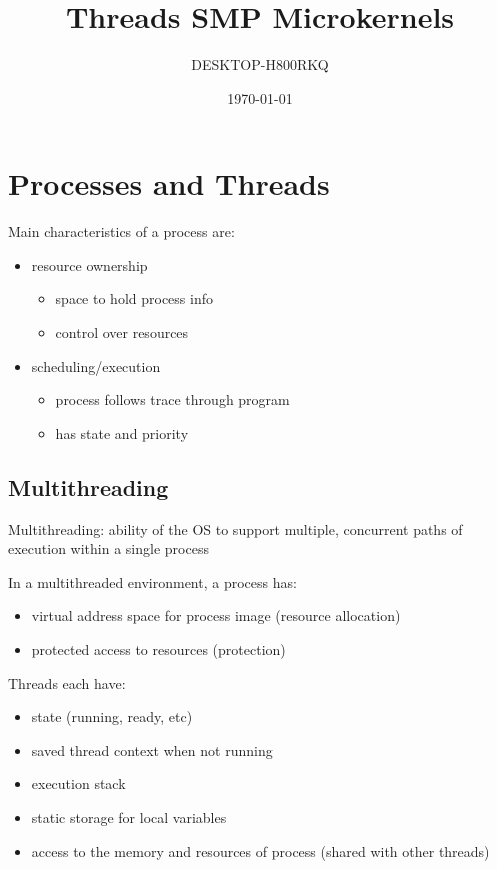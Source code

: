 \documentclass[11pt]{article}
\author{DESKTOP-H800RKQ}
\date{\today}
\title{Threads SMP Microkernels}
\begin{document}
\maketitle
\tableofcontents

\setlength\parindent{0pt}
\section{Processes and Threads}
\label{sec:org8b6a5e0}
Main characteristics of a process are:
\begin{itemize}
\item resource ownership
\begin{itemize}
\item space to hold process info
\item control over resources
\end{itemize}
\item scheduling/execution
\begin{itemize}
\item process follows trace through program
\item has state and priority
\end{itemize}
\end{itemize}
\subsection{Multithreading}
\label{sec:org333c881}

Multithreading: ability of the OS to support multiple,
concurrent paths of execution within a single process

In a multithreaded environment, a process has:
\begin{itemize}
\item virtual address space for process image (resource allocation)
\item protected access to resources (protection)
\end{itemize}

Threads each have:
\begin{itemize}
\item state (running, ready, etc)
\item saved thread context when not running
\item execution stack
\item static storage for local variables
\item access to the memory and resources of process (shared with other threads)
\end{itemize}
\end{document}
